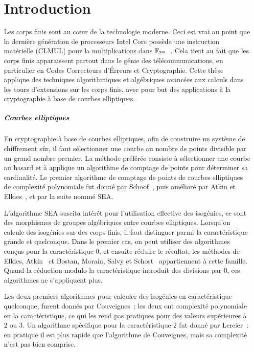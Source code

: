 \chapter*{Introduction}

Les corps finis sont au cœur de la technologie moderne. Ceci est vrai
au point que la dernière génération de processeurs Intel Core possède
une instruction matérielle (CLMUL) pour la multiplications dans
$\mathbb{F}_{2^m}$~\cite{intel-carryless}. Cela tient au fait que les corps
finis apparaissent partout dans le génie des télécommunications, en
particulier en Codes Correcteurs d'Érreurs et Cryptographie. Cette
thèse applique des techniques algorithmiques et algébriques avancées
aux calculs dans les tours d'extensions sur les corps finis, avec pour
but des applications à la cryptographie à base de courbes elliptiques.

\paragraph*{Courbes elliptiques}
En cryptographie à base de courbes elliptiques, afin de construire un
système de chiffrement sûr, il faut sélectionner une courbe au nombre
de points divisible par un grand nombre premier. La méthode préférée
consiste à sélectionner une courbe au hasard et à applique un
algorithme de comptage de points pour déterminer sa cardinalité. Le
premier algorithme de comptage de points de courbes elliptiques de
complexité polynomiale fut donné par Schoof~\cite{schoof85}, puis
amélioré par Atkin et Elkies~\cite{atkin88,elkies98,schoof95}, et par
la suite nommé SEA.

L'algorithme SEA suscita intérêt pour l'utilisation effective des
isogénies, ce sont des morphismes de groupes algébriques entre courbes
elliptiques. Lorsqu'on calcule des isogénies sur des corps finis, il
faut distinguer parmi la caractéristique grande et quelconque. Dans le
premier cas, on peut utiliser des algorithmes conçus pour la
caractéristique $0$, et ensuite réduire le résultat; les méthodes de
Elkies\cite{elkies98,morain95}, Atkin~\cite{schoof95} et Bostan,
Morain, Salvy et Schost~\cite{bostan+morain+salvy+schost08}
appartiennent à cette famille. Quand la réduction modulo la
caractéristique introduit des divisions par $0$, ces algorithmes ne
s'appliquent plus.

Les deux premiers algorithmes pour calculer des isogénies en
caractéristique quelconque, furent donnés par
Couveignes~\cite{couveignes94,couveignes96}; les deux ont complexité
polynomiale en la caractéristique, ce qui les rend pas pratiques pour
des valeurs supérieures à $2$ ou $3$. Un algorithme spécifique pour la
caractéristique $2$ fut donné par Lercier~\cite{lercier96}: en
pratique il est plus rapide que l'algorithme de Couveignes, mais sa
complexité n'est pas bien comprise.

